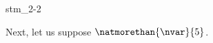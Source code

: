 \documentclass{stex}
\begin{document}
\begin{smodule}{stm_2-2}
  
  \begin{sassertion}[id=stm-2.2]
    Next, let us suppose $\natmorethan{\nvar}{5}$.
  \end{sassertion}
\end{smodule}
\end{document}

